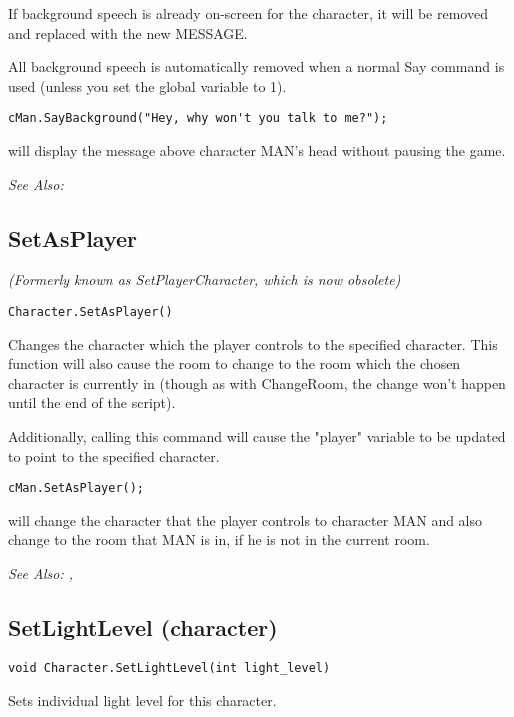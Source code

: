 If background speech is already on-screen for the character, it will be removed and
replaced with the new MESSAGE.

All background speech is automatically removed when a normal Say command
is used (unless you set the global variable  to 1).

\begin{verbatim}
cMan.SayBackground("Hey, why won't you talk to me?");
\end{verbatim}
will display the message above character MAN's head without pausing the game.

\it{See Also:} 


\subsection{SetAsPlayer}\label{Character.SetAsPlayer}%

\it{(Formerly known as SetPlayerCharacter, which is now obsolete)}

\begin{verbatim}
Character.SetAsPlayer()
\end{verbatim}
Changes the character which the player controls to the specified character.
This function will also cause the room to change to the room which the
chosen character is currently in (though as with ChangeRoom, the change won't
happen until the end of the script).

Additionally, calling this command will cause the "player" variable to be
updated to point to the specified character.

\begin{verbatim}
cMan.SetAsPlayer();
\end{verbatim}
will change the character that the player controls to character MAN and also change to the room
that MAN is in, if he is not in the current room.

\it{See Also:} ,


\subsection{SetLightLevel (character)}\label{Character.SetLightLevel}%

\begin{verbatim}
void Character.SetLightLevel(int light_level)
\end{verbatim}
Sets individual light level for this character.

